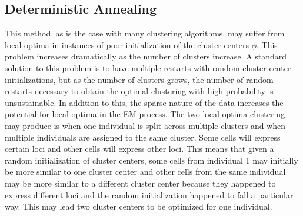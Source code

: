 \subsection{Deterministic Annealing} 
\par{
This method, as is the case with many clustering algorithms, may suffer from local optima in instances of poor initialization of the cluster centers $\phi$. This problem increases dramatically as the number of clusters increase. A standard solution to this problem is to have multiple restarts with random cluster center initializations, but as the number of clusters grows, the number of random restarts necessary to obtain the optimal clustering with high probability is unsustainable\cite{kmeansiterations}\cite{kmeansslow}. In addition to this, the sparse nature of the data increases the potential for local optima in the EM process. The two local optima clustering may produce is when one individual is split across multiple clusters and when multiple individuals are assigned to the same cluster. Some cells will express certain loci and other cells will express other loci. This means that given a random initialization of cluster centers, some cells from individual 1 may initially be more similar to one cluster center and other cells from the same individual may be more similar to a different cluster center because they happened to express different loci and the random initialization happened to fall a particular way. This may lead two cluster centers to be optimized for one individual. }

